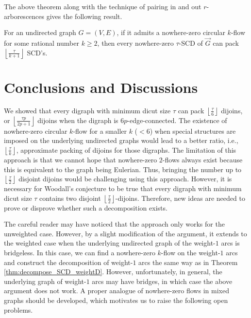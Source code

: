 \documentclass[runningheads]{llncs}
\newcommand{\rounddown}[1]{\left\lfloor#1\right\rfloor}
\begin{document}
The above theorem along with the technique of pairing in and out $r$-arborescences gives the following result.

\begin{theorem}\label{thm:pack_SCD1}
    For an undirected graph $G=(V,E)$, if it admits a nowhere-zero circular $k$-flow for some rational number $k\geq 2$, then every nowhere-zero $\tau$-SCD of $\vec{G}$ can pack $\rounddown{\frac{\tau}{k+1}}$ SCD's.
\end{theorem}




\section{Conclusions and Discussions}
We showed that every digraph with minimum dicut size $\tau$ can pack $\rounddown{\frac{\tau}{6}}$ dijoins, or $\rounddown{\frac{\tau p}{2p+1}}$ dijoins when the digraph is $6p$-edge-connected. 
The existence of nowhere-zero circular $k$-flow for a smaller $k$ ($<6$) when special structures are imposed on the underlying undirected graphs would lead to a better ratio, i.e., $\rounddown{\frac{\tau}{k}}$, approximate packing of dijoins for those digraphs. 
The limitation of this approach is that we cannot hope that nowhere-zero $2$-flows always exist because this is equivalent to the graph being Eulerian. Thus, bringing the number up to $\rounddown{\frac{\tau}{2}}$ disjoint dijoins would be challenging using this approach. However, it is necessary for Woodall's conjecture to be true that every digraph with minimum dicut size $\tau$ contains two disjoint $\rounddown{\frac{\tau}{2}}$-dijoins. Therefore, new ideas are needed to prove or disprove whether such a decomposition exists.

The careful reader may have noticed that the approach only works for the unweighted case. However, by a slight modification of the argument, it extends to the weighted case when the underlying undirected graph of the weight-$1$ arcs is bridgeless. In this case, we can find a nowhere-zero $k$-flow on the weight-$1$ arcs and construct the decomposition of weight-$1$ arcs the same way as in Theorem \ref{thm:decompose_SCD_weightD}. However, unfortunately, in general, the underlying graph of weight-$1$ arcs may have bridges, in which case the above argument does not work. 
A proper analogue of nowhere-zero flows in mixed graphs should be developed, which motivates us to raise the following open problems.
    
\end{document}

